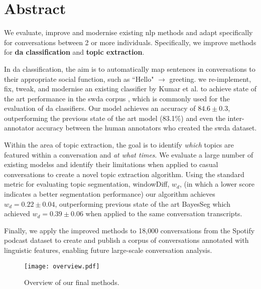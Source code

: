 \chapter*{Abstract}
\thispagestyle{empty}
We evaluate, improve and modernise existing \gls{nlp} methods and adapt specifically for conversations between 2 or more individuals. Specifically, we improve methods for \textbf{\gls{da} classification} and \textbf{topic extraction}.

In \gls{da} classification, the aim is to automatically map sentences in conversations to their appropriate social function, such as ``Hello" $\rightarrow$ greeting. we re-implement, fix, tweak, and modernise an existing classifier by Kumar et al.\cite{kumar2017dialogue} to achieve state of the art performance in the \gls{swda} corpus \cite{swda}, which is commonly used for the evaluation of \gls{da} classifiers.
Our \gls{model} achieves an accuracy of $\mathbf{84.6 \pm 0.3}$, outperforming the previous state of the art \gls{model} (83.1\%)\cite{ravi2018self} and even the inter-annotator accuracy between the human annotators who created the \gls{swda} dataset\cite{swda}.

Within the area of topic extraction, the goal is to identify \textit{which} topics are featured within a conversation and \textit{at what times}. We evaluate a large number of existing \glspl{models} and identify their limitations when applied to casual conversations to create a novel topic extraction algorithm.
Using the standard metric for evaluating topic segmentation, windowDiff, $w_d$, (in which a lower score indicates a better segmentation performance) our algorithm achieves $w_d = \mathbf{0.22 \pm 0.04}$, outperforming previous state of the art BayesSeg\cite{eisenstein2008bayesian} which achieved $w_d = 0.39 \pm 0.06$ when applied to the same conversation transcripts.

Finally, we apply the improved methods to 18,000 conversations from the Spotify podcast dataset\cite{clifton-2020100000} to create and publish a corpus of conversations annotated with linguistic features, enabling future large-scale conversation analysis.

\begin{figure}
    \centering
    \texttt{[image: overview.pdf]}
    \caption{Overview of our final methods.}
    \label{fig:overview}
\end{figure}
\glsresetall
\newpage
